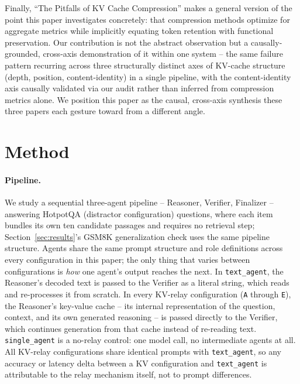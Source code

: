 \documentclass[11pt]{article}
\begin{document}
Finally, ``The Pitfalls of KV Cache Compression'' \citep{pitfallskv2026}
makes a general version of the point this paper investigates concretely:
that compression methods optimize for aggregate metrics while implicitly
equating token retention with functional preservation. Our contribution is
not the abstract observation but a causally-grounded, cross-axis
demonstration of it within one system -- the same failure pattern
recurring across three structurally distinct axes of KV-cache structure
(depth, position, content-identity) in a single pipeline, with the
content-identity axis causally validated via our audit rather than
inferred from compression metrics alone. We position this paper as the
causal, cross-axis synthesis these three papers each gesture toward from a
different angle.

\section{Method}
\label{sec:method}

\paragraph{Pipeline.} We study a sequential three-agent pipeline --
Reasoner, Verifier, Finalizer -- answering HotpotQA
\citep{hotpotqa2018} (distractor configuration) questions, where each item
bundles its own ten candidate passages and requires no retrieval step;
Section~\ref{sec:results}'s GSM8K \citep{gsm8k2021} generalization check
uses the same pipeline structure. Agents share the same prompt structure
and role definitions across every configuration in this paper; the only
thing that varies between configurations is \emph{how} one agent's output
reaches the next. In \texttt{text\_agent}, the Reasoner's decoded text is
passed to the Verifier as a literal string, which reads and re-processes
it from scratch. In every KV-relay configuration (\texttt{A} through
\texttt{E}), the Reasoner's key-value cache -- its internal representation
of the question, context, and its own generated reasoning -- is passed
directly to the Verifier, which continues generation from that cache
instead of re-reading text. \texttt{single\_agent} is a no-relay control:
one model call, no intermediate agents at all. All KV-relay configurations
share identical prompts with \texttt{text\_agent}, so any accuracy or
latency delta between a KV configuration and \texttt{text\_agent} is
attributable to the relay mechanism itself, not to prompt differences.
\end{document}
